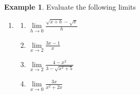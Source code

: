 \documentclass[11pt,a4paper]{article}
\theoremstyle{definition}
\newtheorem{example}[thm]{Example}
\begin{document}
\begin{example}

Evaluate the following limits
\begin{enumerate}
\item[]
\begin{enumerate}
        \item $\lim\limits_{h\longrightarrow 0}\frac{\sqrt{x+h}-\sqrt{x}}{h}$
        \item $\lim\limits_{x\longrightarrow 2}\frac{3x-1}{x}$
        \item $\lim\limits_{x\longrightarrow 2}\frac{4-x^2}{3-\sqrt{x^2+5}}$
        \item $\lim\limits_{x\longrightarrow 0}\frac{3x}{x^2+2x}$\\
\end{enumerate}
\end{enumerate}


\vspace{0.5cm}
\end{example}
\end{document}
